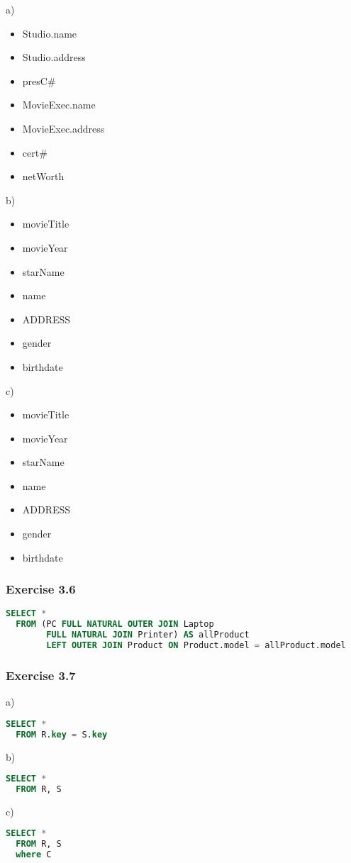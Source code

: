 \documentclass[../../main.tex]{subfiles}
\begin{document}
a)

\begin{itemize}
  \item Studio.name
  \item Studio.address
  \item presC\#
  \item MovieExec.name
  \item MovieExec.address
  \item cert\#
  \item netWorth
\end{itemize}

b)

\begin{itemize}
  \item movieTitle
  \item movieYear
  \item starName
  \item name
  \item ADDRESS
  \item gender
  \item birthdate
\end{itemize}

c)

\begin{itemize}
  \item movieTitle
  \item movieYear
  \item starName
  \item name
  \item ADDRESS
  \item gender
  \item birthdate
\end{itemize}

\subsubsection*{Exercise 3.6}

\begin{lstlisting}[language=sql]
  SELECT *
  FROM (PC FULL NATURAL OUTER JOIN Laptop
        FULL NATURAL JOIN Printer) AS allProduct
        LEFT OUTER JOIN Product ON Product.model = allProduct.model
\end{lstlisting}

\subsubsection*{Exercise 3.7}

a)

\begin{lstlisting}[language=sql]
  SELECT *
  FROM R.key = S.key
\end{lstlisting}

b)

\begin{lstlisting}[language=sql]
  SELECT *
  FROM R, S
\end{lstlisting}

c)

\begin{lstlisting}[language=sql]
  SELECT *
  FROM R, S
  where C
\end{lstlisting}
\end{document}
